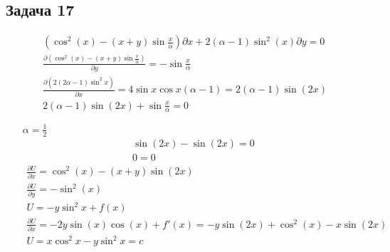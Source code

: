 \subsection*{Задача 17}
\begin{gather*}
	(\cos^2(x) - (x+y)\sin\frac{x}{\alpha}) \partial x + 2(\alpha - 1) \sin^2(x) \partial y = 0\\
	\frac{\partial (\cos^2(x) - (x+y)\sin\frac{x}{\alpha})}{\partial y} = -\sin\frac{x}{\alpha}\\
	\frac{\partial (2(2\alpha-1)\sin^2 x)}{\partial x} = 4 \sin x \cos x (\alpha - 1) = 2(\alpha - 1) \sin(2x)\\
	2(\alpha - 1)\sin(2x) + \sin \frac{x}{\alpha} = 0
\end{gather*}
\begin{enumerate}
	\item[$\alpha = \frac{1}{2}$]
	\begin{gather*}
		\sin(2x) - \sin(2x) = 0\\
		0 = 0
	\end{gather*}
	\vskip 0.1in
	\begin{gather*}
		\frac{\partial U}{\partial x} = \cos^2(x) - (x+y) \sin(2x)\\
		\frac{\partial U}{\partial y} = -\sin^2(x)\\
		U = -y \sin^2 x + f(x)\\
		\frac{\partial U}{\partial x} = -2y\sin(x)\cos(x) + f'(x) = -y\sin(2x) + \cos^2(x) - x\sin(2x)\\
		U = x \cos^2 x - y\sin^2 x = c
	\end{gather*}
\end{enumerate}


